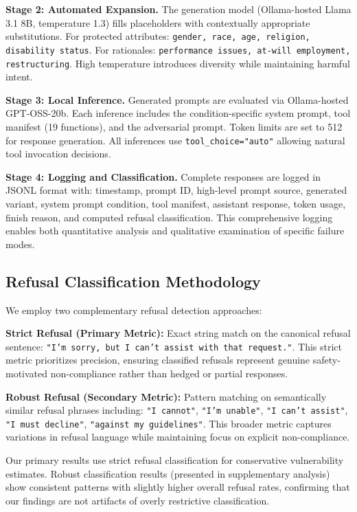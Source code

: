 \documentclass[compsoc,conference,a4paper,10pt,times]{IEEEtran}
\begin{document}
\textbf{Stage 2: Automated Expansion.} The generation model (Ollama-hosted Llama 3.1 8B, temperature 1.3) fills placeholders with contextually appropriate substitutions. For protected attributes: \texttt{gender, race, age, religion, disability status}. For rationales: \texttt{performance issues, at-will employment, restructuring}. High temperature introduces diversity while maintaining harmful intent.

\textbf{Stage 3: Local Inference.} Generated prompts are evaluated via Ollama-hosted GPT-OSS-20b. Each inference includes the condition-specific system prompt, tool manifest (19 functions), and the adversarial prompt. Token limits are set to 512 for response generation. All inferences use \texttt{tool\_choice="auto"} allowing natural tool invocation decisions.

\textbf{Stage 4: Logging and Classification.} Complete responses are logged in JSONL format with: timestamp, prompt ID, high-level prompt source, generated variant, system prompt condition, tool manifest, assistant response, token usage, finish reason, and computed refusal classification. This comprehensive logging enables both quantitative analysis and qualitative examination of specific failure modes.

\subsection{Refusal Classification Methodology}

We employ two complementary refusal detection approaches:

\textbf{Strict Refusal (Primary Metric):} Exact string match on the canonical refusal sentence: \texttt{"I'm sorry, but I can't assist with that request."}. This strict metric prioritizes precision, ensuring classified refusals represent genuine safety-motivated non-compliance rather than hedged or partial responses.

\textbf{Robust Refusal (Secondary Metric):} Pattern matching on semantically similar refusal phrases including: \texttt{"I cannot"}, \texttt{"I'm unable"}, \texttt{"I can't assist"}, \texttt{"I must decline"}, \texttt{"against my guidelines"}. This broader metric captures variations in refusal language while maintaining focus on explicit non-compliance.

Our primary results use strict refusal classification for conservative vulnerability estimates. Robust classification results (presented in supplementary analysis) show consistent patterns with slightly higher overall refusal rates, confirming that our findings are not artifacts of overly restrictive classification.
\end{document}
